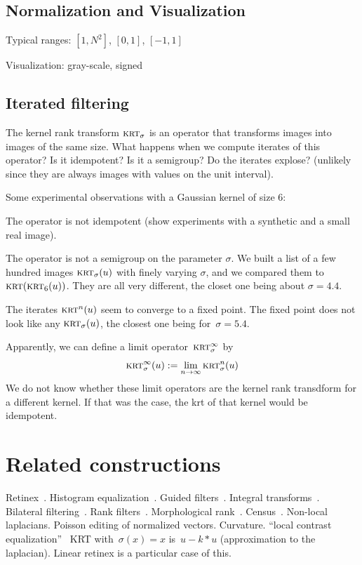 \documentclass[12pt]{article}                  %
\begin{document}
\subsection{Normalization and Visualization}

Typical ranges: $[1,N^2]$, $[0,1]$, $[-1,1]$

Visualization: gray-scale, signed



\subsection{Iterated filtering}

The kernel rank transform $\textsc{krt}_\sigma$ is an operator that transforms images into images of the same size.
What happens when we compute iterates of this operator?   Is it idempotent?  Is it a semigroup?  Do the iterates explose? (unlikely since they are always images with values on the unit interval).

Some experimental observations with a Gaussian kernel of size
6:

The operator is not idempotent (show experiments with a synthetic and a small real image).

The operator is not a semigroup on the parameter $\sigma$.  We built a list
of a few hundred images $\textsc{krt}_\sigma(u)$ with finely varying
$\sigma$, and we compared them to $\textsc{krt}(\textsc{krt}_6(u))$.  They are all very different, the closet one being about $\sigma=4.4$.

The iterates $\textsc{krt}^n(u)$ seem to converge to a fixed point.  The
fixed point does not look like any $\textsc{krt}_\sigma(u)$, the closest one being for~$\sigma=5.4$.

Apparently, we can define a limit operator~$\textsc{krt}^\infty_\sigma$ by
\[
	\textsc{krt}^\infty_\sigma(u) := \lim_{n\to\infty}\textsc{krt}^n_\sigma(u)
\]
We do not know whether these limit operators are the kernel rank transdform for a different kernel.   If that was the case, the krt of that kernel  would be idempotent.   

\section{Related constructions}

Retinex~\cite{land1971lightness,land1977retinex,land1985recent,kimmel2003variational,provenzi2005mathematical,morel2010pde,petro2014multiscale}.
Histogram equalization~\cite{pizer1987adaptive,abdullah2007dynamic}.
Guided filters~\cite{he2012guided}.
Integral transforms~\cite{bradley2007adaptive}.
Bilateral filtering~\cite{tomasi1998bilateral,durand2002fast,paris2009bilateral}.
Rank filters~\cite{rankfilters1985}.
Morphological rank~\cite{soille2002morphological}.
Census~\cite{ZW,stein2004efficient,whycensus2013}.
Non-local laplacians.
Poisson editing of normalized vectors.
Curvature.
``local contrast equalization''~\cite{sapiro1997histogram}
KRT with~$\sigma(x)=x$ is~$u-k*u$ (approximation to the laplacian).  Linear
retinex is a particular case of this.
\end{document}
